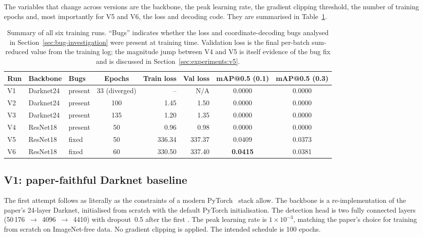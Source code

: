 The variables that change across versions are the backbone, the peak learning
rate, the gradient clipping threshold, the number of training epochs and, most
importantly for V5 and V6, the loss and decoding code. They are summarised in
Table~\ref{tab:run-summary}.

\begin{table}[ht]
\centering
\caption{Summary of all six training runs. ``Bugs'' indicates whether the loss
and coordinate-decoding bugs analysed in Section~\ref{sec:bug-investigation}
were present at training time. Validation loss is the final per-batch
sum-reduced value from the training log; the magnitude jump between V4 and V5
is itself evidence of the bug fix and is discussed in
Section~\ref{sec:experiments:v5}.}
\label{tab:run-summary}
\small
\begin{tabular}{lllcrrcc}
\toprule
\textbf{Run} & \textbf{Backbone} & \textbf{Bugs} & \textbf{Epochs} &
\textbf{Train loss} & \textbf{Val loss} &
\textbf{mAP@0.5 (0.1)} & \textbf{mAP@0.5 (0.3)} \\
\midrule
V1 & Darknet24 & present & 33 (diverged) & --     & N/A  & 0.0000 & 0.0000 \\
V2 & Darknet24 & present & 100           & 1.45   & 1.50 & 0.0000 & 0.0000 \\
V3 & Darknet24 & present & 135           & 1.20   & 1.35 & 0.0000 & 0.0000 \\
V4 & ResNet18  & present & 50            & 0.96   & 0.98 & 0.0000 & 0.0000 \\
V5 & ResNet18  & fixed   & 50            & 336.34 & 337.37 & 0.0409 & 0.0373 \\
V6 & ResNet18  & fixed   & 60            & 330.50 & 337.40 & \textbf{0.0415} & 0.0381 \\
\bottomrule
\end{tabular}
\end{table}

\subsection{V1: paper-faithful Darknet baseline}
\label{sec:experiments:v1}

The first attempt follows \citet{redmon2016you} as literally as the constraints
of a modern PyTorch~\citep{paszke2019pytorch} stack allow. The backbone is a
re-implementation of the paper's 24-layer Darknet, initialised from scratch
with the default PyTorch initialisation. The detection head is two fully
connected layers (50\,176~$\to$~4096~$\to$~4410) with dropout~0.5 after the
first \citep{srivastava2014dropout}. The peak learning rate is
$1\!\times\!10^{-3}$, matching the paper's choice for training from scratch on
ImageNet-free data. No gradient clipping is applied. The intended schedule is
100 epochs.

